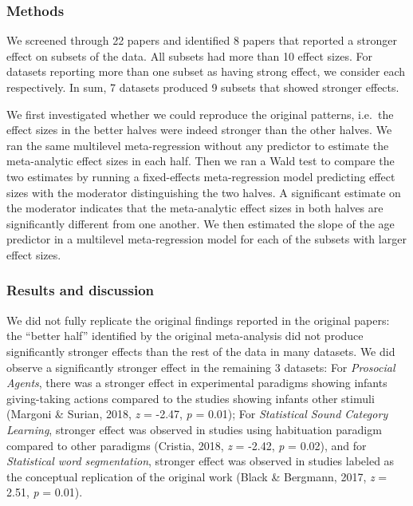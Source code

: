 \documentclass[
  man]{apa6}
\begin{document}
\hypertarget{methods-3}{%
\subsubsection{Methods}\label{methods-3}}

We screened through 22 papers and identified 8 papers that reported a stronger effect on subsets of the data. All subsets had more than 10 effect sizes. For datasets reporting more than one subset as having strong effect, we consider each respectively. In sum, 7 datasets produced 9 subsets that showed stronger effects.

We first investigated whether we could reproduce the original patterns, i.e.~the effect sizes in the better halves were indeed stronger than the other halves. We ran the same multilevel meta-regression without any predictor to estimate the meta-analytic effect sizes in each half. Then we ran a Wald test to compare the two estimates by running a fixed-effects meta-regression model predicting effect sizes with the moderator distinguishing the two halves. A significant estimate on the moderator indicates that the meta-analytic effect sizes in both halves are significantly different from one another. We then estimated the slope of the age predictor in a multilevel meta-regression model for each of the subsets with larger effect sizes.

\hypertarget{results-and-discussion-2}{%
\subsubsection{Results and discussion}\label{results-and-discussion-2}}

We did not fully replicate the original findings reported in the original papers: the ``better half'' identified by the original meta-analysis did not produce significantly stronger effects than the rest of the data in many datasets. We did observe a significantly stronger effect in the remaining 3 datasets: For \emph{Prosocial Agents}, there was a stronger effect in experimental paradigms showing infants giving-taking actions compared to the studies showing infants other stimuli (Margoni \& Surian, 2018, \emph{z} = -2.47, \emph{p} = 0.01); For \emph{Statistical Sound Category Learning}, stronger effect was observed in studies using habituation paradigm compared to other paradigms (Cristia, 2018, \emph{z} = -2.42, \emph{p} = 0.02), and for \emph{Statistical word segmentation}, stronger effect was observed in studies labeled as the conceptual replication of the original work (Black \& Bergmann, 2017, \emph{z} = 2.51, \emph{p} = 0.01).
\end{document}
